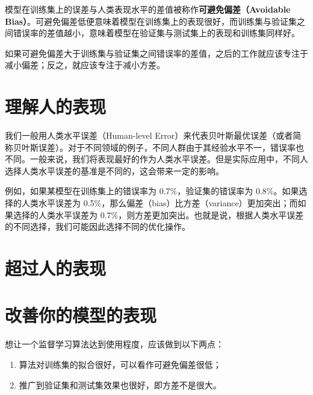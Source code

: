 \documentclass[../../main.tex]{subfiles}
\begin{document}
模型在训练集上的误差与人类表现水平的差值被称作\textbf{可避免偏差（Avoidable Bias）}。可避免偏差低便意味着模型在训练集上的表现很好，而训练集与验证集之间错误率的差值越小，意味着模型在验证集与测试集上的表现和训练集同样好。

如果可避免偏差大于训练集与验证集之间错误率的差值，之后的工作就应该专注于减小偏差；反之，就应该专注于减小方差。

\section{理解人的表现}
我们一般用人类水平误差（Human-level Error）来代表贝叶斯最优误差（或者简称贝叶斯误差）。对于不同领域的例子，不同人群由于其经验水平不一，错误率也不同。一般来说，我们将表现最好的作为人类水平误差。但是实际应用中，不同人选择人类水平误差的基准是不同的，这会带来一定的影响。

例如，如果某模型在训练集上的错误率为 0.7\%，验证集的错误率为 0.8\%。如果选择的人类水平误差为 0.5\%，那么偏差（bias）比方差（variance）更加突出；而如果选择的人类水平误差为 0.7\%，则方差更加突出。也就是说，根据人类水平误差的不同选择，我们可能因此选择不同的优化操作。

\section{超过人的表现}

\section{改善你的模型的表现}
想让一个监督学习算法达到使用程度，应该做到以下两点：
\begin{enumerate}
    \item 算法对训练集的拟合很好，可以看作可避免偏差很低；
    \item 推广到验证集和测试集效果也很好，即方差不是很大。
\end{enumerate}
\begin{figure}[H]
    \centering

\end{figure}
\end{document}
